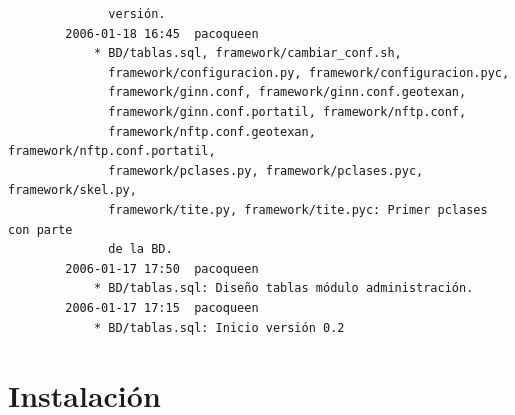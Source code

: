 \documentclass[a4paper]{article}
\begin{document}
\begin{verbatim}
              versión.
        2006-01-18 16:45  pacoqueen
            * BD/tablas.sql, framework/cambiar_conf.sh,
              framework/configuracion.py, framework/configuracion.pyc,
              framework/ginn.conf, framework/ginn.conf.geotexan,
              framework/ginn.conf.portatil, framework/nftp.conf,
              framework/nftp.conf.geotexan, framework/nftp.conf.portatil,
              framework/pclases.py, framework/pclases.pyc, framework/skel.py,
              framework/tite.py, framework/tite.pyc: Primer pclases con parte
              de la BD.
        2006-01-17 17:50  pacoqueen
            * BD/tablas.sql: Diseño tablas módulo administración.
        2006-01-17 17:15  pacoqueen
            * BD/tablas.sql: Inicio versión 0.2

        \end{verbatim}
        \normalsize

    \section{Instalación}   \label{sec:install}
\end{document}
